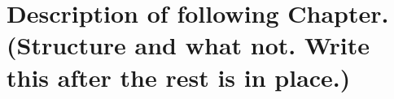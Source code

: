 \documentclass[main.tex]{subfiles}
\begin{document}
\section*{Description of following Chapter. (Structure and what not. Write this after the rest is in place.)}
\end{document}
